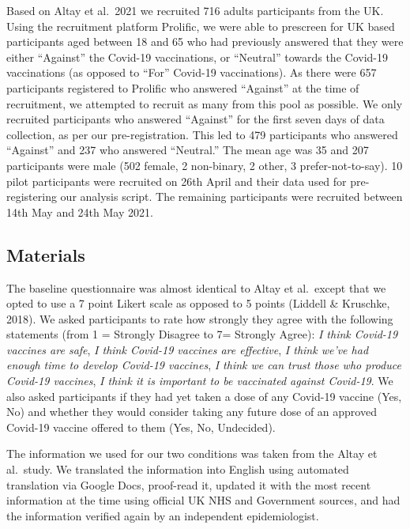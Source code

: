 \documentclass[english,,jou,floatsintext]{apa6}
\begin{document}
Based on Altay et al.~2021 we recruited 716 adults participants from the UK. Using the recruitment platform Prolific, we were able to prescreen for UK based participants aged between 18 and 65 who had previously answered that they were either \enquote{Against} the Covid-19 vaccinations, or \enquote{Neutral} towards the Covid-19 vaccinations (as opposed to \enquote{For} Covid-19 vaccinations). As there were 657 participants registered to Prolific who answered \enquote{Against} at the time of recruitment, we attempted to recruit as many from this pool as possible. We only recruited participants who answered \enquote{Against} for the first seven days of data collection, as per our pre-registration. This led to 479 participants who answered \enquote{Against} and 237 who answered \enquote{Neutral.} The mean age was 35 and 207 participants were male (502 female, 2 non-binary, 2 other, 3 prefer-not-to-say). 10 pilot participants were recruited on 26th April and their data used for pre-registering our analysis script. The remaining participants were recruited between 14th May and 24th May 2021.

\hypertarget{materials}{%
\subsection{Materials}\label{materials}}

The baseline questionnaire was almost identical to Altay et al.~except that we opted to use a 7 point Likert scale as opposed to 5 points (Liddell \& Kruschke, 2018). We asked participants to rate how strongly they agree with the following statements (from 1 = Strongly Disagree to 7= Strongly Agree): \emph{I think Covid-19 vaccines are safe}, \emph{I think Covid-19 vaccines are effective}, \emph{I think we've had enough time to develop Covid-19 vaccines}, \emph{I think we can trust those who produce Covid-19 vaccines}, \emph{I think it is important to be vaccinated against Covid-19}. We also asked participants if they had yet taken a dose of any Covid-19 vaccine (Yes, No) and whether they would consider taking any future dose of an approved Covid-19 vaccine offered to them (Yes, No, Undecided).

The information we used for our two conditions was taken from the Altay et al.~study. We translated the information into English using automated translation via Google Docs, proof-read it, updated it with the most recent information at the time using official UK NHS and Government sources, and had the information verified again by an independent epidemiologist.
\end{document}
